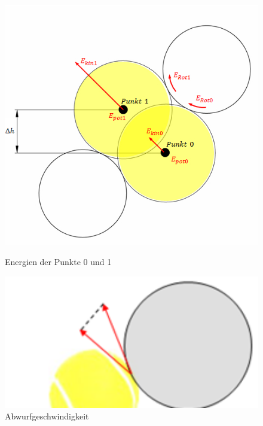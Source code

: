 \begin{figure}[h!]
    \begin{minipage}[hbt]{0.6\textwidth}
    	\centering
    	\includegraphics[width=1\textwidth]{Enddokumentation/Anhang/Bilder/Energien.jpg}
    	\caption{Energien der Punkte 0 und 1}
    	\label{fig:Energien}
    \end{minipage}
\hfill
    \begin{minipage}[hbt]{0.4\textwidth}
    	\centering
    	\includegraphics[width=1\textwidth]{Enddokumentation/Anhang/Bilder/AbwurfBild.png}
    	\caption{Abwurfgeschwindigkeit}
    	\label{fig:Abwurfgeschwindigkeit}
    \end{minipage}
\end{figure}

